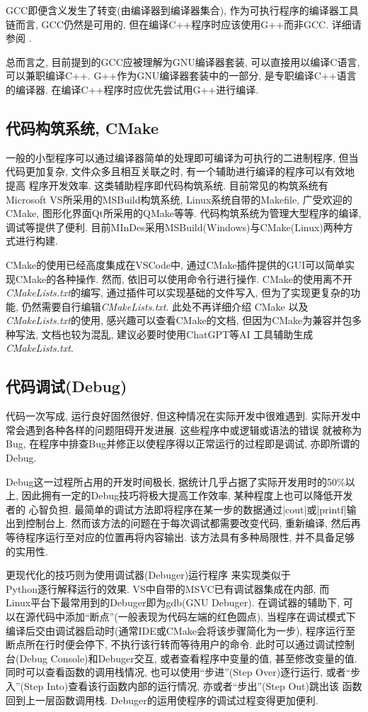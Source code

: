 GCC即便含义发生了转变(由编译器到编译器集合), 作为可执行程序的编译器工具链而言, GCC仍然是可用的, 但在编译C++程序时应该使用G++而非GCC. 详细请参阅
.

总而言之, 目前提到的GCC应被理解为GNU编译器套装, 可以直接用以编译C语言, 可以兼职编译C++. G++作为GNU编译器套装中的一部分, 是专职编译C++语言的编译器.
在编译C++程序时应优先尝试用G++进行编译.

\subsection{代码构筑系统, CMake}
一般的小型程序可以通过编译器简单的处理即可编译为可执行的二进制程序, 但当代码更加复杂, 文件众多且相互关联之时, 有一个辅助进行编译的程序可以有效地提高
程序开发效率. 这类辅助程序即代码构筑系统. 目前常见的构筑系统有Microsoft VS所采用的MSBuild构筑系统, Linux系统自带的Makefile, 广受欢迎的CMake,
图形化界面Qt所采用的QMake等等. 代码构筑系统为管理大型程序的编译, 调试等提供了便利. 目前MInDes采用MSBuild(Windows)与CMake(Linux)两种方式进行构建.

CMake的使用已经高度集成在VSCode中, 通过CMake插件提供的GUI可以简单实现CMake的各种操作. 然而, 依旧可以使用命令行进行操作. CMake的使用离不开
\emph{CMakeLists.txt}的编写, 通过插件可以实现基础的文件写入, 但为了实现更复杂的功能, 仍然需要自行编辑\emph{CMakeLists.txt}. 此处不再详细介绍
CMake 以及 \emph{CMakeLists.txt}的使用, 感兴趣可以查看CMake的文档, 但因为CMake为兼容并包多种写法, 文档也较为混乱, 建议必要时使用ChatGPT等AI
工具辅助生成\emph{CMakeLists.txt}.

\subsection{代码调试(Debug)}
代码一次写成, 运行良好固然很好, 但这种情况在实际开发中很难遇到. 实际开发中常会遇到各种各样的问题阻碍开发进展. 这些程序中或逻辑或语法的错误
就被称为Bug, 在程序中排查Bug并修正以使程序得以正常运行的过程即是调试, 亦即所谓的Debug.

Debug这一过程所占用的开发时间极长, 据统计几乎占据了实际开发用时的50\%以上, 因此拥有一定的Debug技巧将极大提高工作效率, 某种程度上也可以降低开发者的
心智负担. 最简单的调试方法即将程序在某一步的数据通过\cverb|cout|或\cverb|printf|输出到控制台上. 然而该方法的问题在于每次调试都需要改变代码,
重新编译, 然后再等待程序运行至对应的位置再将内容输出. 该方法具有多种局限性, 并不具备足够的实用性.

更现代化的技巧则为使用调试器(Debuger)运行程序
来实现类似于\\Python逐行解释运行的效果. VS中自带的MSVC已有调试器集成在内部, 而\\Linux平台下最常用到的Debuger即为gdb(GNU Debuger). 在调试器的辅助下,
可以在源代码中添加``断点''(一般表现为代码左端的红色圆点), 当程序在调试模式下编译后交由调试器启动时(通常IDE或CMake会将该步骤简化为一步), 程序运行至
断点所在行时便会停下, 不执行该行转而等待用户的命令. 此时可以通过调试控制台(Debug Console)和Debuger交互, 或者查看程序中变量的值, 甚至修改变量的值.
同时可以查看函数的调用栈情况, 也可以使用``步进''(Step Over)逐行运行, 或者``步入''(Step Into)查看该行函数内部的运行情况, 亦或者``步出''(Step Out)跳出该
函数回到上一层函数调用栈. Debuger的运用使程序的调试过程变得更加便利.

